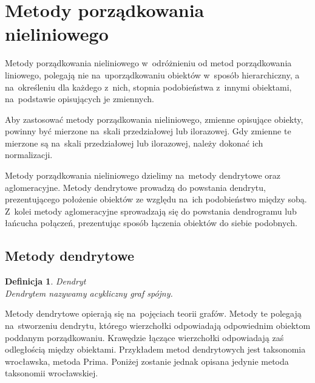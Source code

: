 \documentclass[12pt,a4paper]{report}
\newtheorem{definition}[theorem]{Definicja}
\begin{document}
\section{Metody porządkowania nieliniowego}


Metody porządkowania nieliniowego w~odróżnieniu od metod porządkowania liniowego, polegają nie na~uporządkowaniu obiektów w~sposób hierarchiczny, a na~określeniu dla każdego z~nich, stopnia podobieństwa z~innymi obiektami, na~podstawie opisujących je zmiennych. 

Aby zastosować metody porządkowania nieliniowego, zmienne opisujące obiekty, powinny być mierzone na~skali przedziałowej lub ilorazowej. Gdy zmienne te mierzone są na~skali przedziałowej lub ilorazowej, należy dokonać ich normalizacji.

Metody porządkowania nieliniowego dzielimy na~metody dendrytowe oraz aglomeracyjne. Metody dendrytowe prowadzą do powstania dendrytu, prezentującego położenie obiektów ze względu na~ich podobieństwo między sobą. Z~kolei metody aglomeracyjne sprowadzają się do powstania dendrogramu lub łańcucha połączeń, prezentując sposób łączenia obiektów do siebie podobnych. 

\subsection{Metody dendrytowe}

\begin{definition}{Dendryt \cite[Rozdział 2.3]{panek2013}}\\
Dendrytem nazywamy acykliczny graf spójny.
\end{definition}

Metody dendrytowe opierają się na~pojęciach teorii grafów. Metody te polegają na~stworzeniu dendrytu, którego wierzchołki odpowiadają odpowiednim obiektom poddanym porządkowaniu. Krawędzie łączące wierzchołki odpowiadają zaś odległością między obiektami. Przykładem metod dendrytowych jest taksonomia wrocławska, metoda Prima.   Poniżej zostanie jednak opisana jedynie metoda taksonomii wrocławskiej.  
\end{document}
